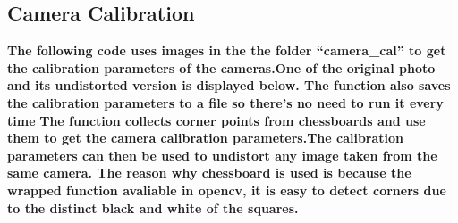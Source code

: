\documentclass[11pt]{article}
\begin{document}
    \hypertarget{camera-calibration}{%
\subsection{Camera Calibration}\label{camera-calibration}}

    \textbf{The following code uses images in the the folder ``camera\_cal''
to get the calibration parameters of the cameras.One of the original
photo and its undistorted version is displayed below. The function also
saves the calibration parameters to a file so there's no need to run it
every time} \textbf{The function collects corner points from chessboards
and use them to get the camera calibration parameters.The calibration
parameters can then be used to undistort any image taken from the same
camera. The reason why chessboard is used is because the wrapped
function avaliable in opencv, it is easy to detect corners due to the
distinct black and white of the squares.}
\end{document}
